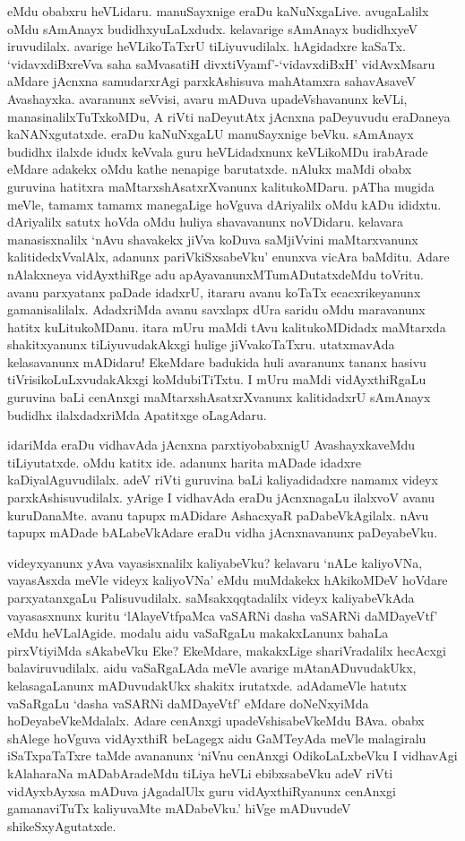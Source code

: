 eMdu obabxru heVLidaru. manuSayxnige eraDu kaNuNxgaLive. avugaLalilx oMdu sAmAnayx budidhxyuLaLxdudx. kelavarige sAmAnayx budidhxyeV 
iruvudilalx. avarige heVLikoTaTxrU tiLiyuvudilalx. hAgidadxre kaSaTx. `vidavxdiBxreVva saha saMvasatiH divxtiVyamf'-`vidavxdiBxH' vidAvxMsaru aMdare jAcnxna 
samudarxrAgi parxkAshisuva mahAtamxra sahavAsaveV Avashayxka. avaranunx seVvisi, avaru mADuva upadeVshavanunx keVLi, manasinalilxTuTxkoMDu, A 
riVti naDeyutAtx jAcnxna paDeyuvudu eraDaneya kaNANxgutatxde. eraDu kaNuNxgaLU manuSayxnige beVku. sAmAnayx budidhx ilalxde 
idudx keVvala guru heVLidadxnunx keVLikoMDu irabArade eMdare adakekx oMdu kathe nenapige barutatxde. nAlukx maMdi obabx guruvina 
hatitxra maMtarxshAsatxrXvanunx kalitukoMDaru. pATha mugida meVle, tamamx tamamx manegaLige hoVguva dAriyalilx oMdu kADu 
ididxtu. dAriyalilx satutx hoVda oMdu huliya shavavanunx noVDidaru. kelavara manasisxnalilx `nAvu shavakekx jiVva koDuva saMjiVvini 
maMtarxvanunx kalitidedxVvalAlx, adanunx pariVkiSxsabeVku' enunxva vicAra baMditu. Adare nAlakxneya vidAyxthiRge adu 
apAyavanunxMTumADutatxdeMdu toVritu. avanu parxyatanx paDade idadxrU, itararu avanu koTaTx ecacxrikeyanunx gamanisalilalx. 
AdadxriMda avanu savxlapx dUra saridu oMdu maravanunx hatitx kuLitukoMDanu. itara mUru maMdi tAvu kalitukoMDidadx maMtarxda 
shakitxyanunx tiLiyuvudakAkxgi hulige jiVvakoTaTxru. utatxmavAda kelasavanunx mADidaru! EkeMdare badukida huli avaranunx tananx hasivu tiVrisikoLuLxvudakAkxgi koMdubiTiTxtu. I mUru maMdi vidAyxthiRgaLu guruvina baLi cenAnxgi maMtarxshAsatxrXvanunx kalitidadxrU sAmAnayx budidhx ilalxdadxriMda Apatitxge oLagAdaru. 

idariMda eraDu vidhavAda jAcnxna parxtiyobabxnigU AvashayxkaveMdu tiLiyutatxde. oMdu katitx ide. adanunx harita mADade idadxre 
kaDiyalAguvudilalx. adeV riVti guruvina baLi kaliyadidadxre namamx videyx parxkAshisuvudilalx. yArige I vidhavAda eraDu jAcnxnagaLu 
ilalxvoV avanu kuruDanaMte. avanu tapupx mADidare AshacxyaR paDabeVkAgilalx. nAvu tapupx mADade bALabeVkAdare eraDu vidha jAcnxnavanunx paDeyabeVku.

videyxyanunx yAva vayasisxnalilx kaliyabeVku? kelavaru `nALe kaliyoVNa, vayasAsxda meVle videyx kaliyoVNa' eMdu muMdakekx 
hAkikoMDeV hoVdare parxyatanxgaLu Palisuvudilalx. saMsakxqqtadalilx videyx kaliyabeVkAda vayasasxnunx kuritu `lAlayeVtfpaMca 
vaSARNi dasha vaSARNi daMDayeVtf' eMdu heVLalAgide. modalu aidu vaSaRgaLu makakxLanunx bahaLa pirxVtiyiMda sAkabeVku Eke? EkeMdare, 
makakxLige shariVradalilx hecAcxgi balaviruvudilalx. aidu vaSaRgaLAda meVle avarige mAtanADuvudakUkx, kelasagaLanunx mADuvudakUkx 
shakitx irutatxde. adAdameVle hatutx vaSaRgaLu `dasha vaSARNi daMDayeVtf' eMdare doNeNxyiMda hoDeyabeVkeMdalalx. Adare 
cenAnxgi upadeVshisabeVkeMdu BAva. obabx shAlege hoVguva vidAyxthiR beLagegx aidu GaMTeyAda meVle malagiralu iSaTxpaTaTxre taMde avananunx 
`niVnu cenAnxgi OdikoLaLxbeVku I vidhavAgi kAlaharaNa mADabAradeMdu tiLiya heVLi ebibxsabeVku adeV riVti vidAyxbAyxsa mADuva jAgadalUlx guru 
vidAyxthiRyanunx cenAnxgi gamanaviTuTx kaliyuvaMte mADabeVku.' hiVge mADuvudeV shikeSxyAgutatxde. 

